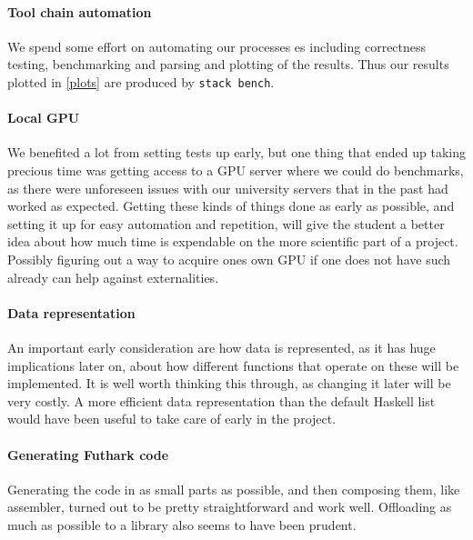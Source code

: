 \paragraph{Tool chain automation}
We spend some effort on automating our processes es including
correctness testing, benchmarking and parsing and plotting of the results.  Thus
our results plotted in \autoref{plots} are produced by \texttt{stack bench}.

\paragraph{Local GPU}
We benefited a lot from setting tests up early, but one thing that ended up taking
precious time was getting access to a GPU server where we could do benchmarks, as
there were unforeseen issues with our university servers that in the past had worked as
expected. Getting these kinds of things done as early as possible, and setting it up
for easy automation and repetition, will give the student a better idea about how
much time is expendable on the more scientific part of a project. Possibly figuring
out a way to acquire ones own GPU if one does not have such already can help against
externalities.

\paragraph{Data representation} An important early consideration are how data is
represented, as it has huge
implications later on, about how different functions that operate on these will be
implemented. It is well worth thinking this through, as changing it later will be
very costly. A more efficient data representation than the default Haskell list
would have been useful to take care of early in the project.

\paragraph{Generating Futhark code} Generating the code
in as small parts as possible, and then composing them, like assembler, turned out
to be pretty straightforward and work well. Offloading as much as possible to a
library also seems to have been prudent.
